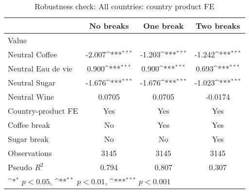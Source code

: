 \begin{table}[htbp]\centering
\def\sym#1{\ifmmode^{#1}\else\(^{#1}\)\fi}
\caption{Robustness check: All countries: country product FE\label{tab1}}
\begin{tabular}{l*{3}{c}}
\hline\hline
                    &\multicolumn{1}{c}{No breaks}&\multicolumn{1}{c}{One break}&\multicolumn{1}{c}{Two breaks}\\
\hline
Value               &                     &                     &                     \\
Neutral Coffee      &      -2.007\sym{***}&      -1.203\sym{***}&      -1.242\sym{***}\\
Neutral Eau de vie  &       0.900\sym{***}&       0.900\sym{***}&       0.693\sym{***}\\
Neutral Sugar       &      -1.676\sym{***}&      -1.676\sym{***}&      -1.023\sym{***}\\
Neutral Wine        &      0.0705         &      0.0705         &     -0.0174         \\
Country-product FE  &         Yes         &         Yes         &         Yes         \\
Coffee break        &          No         &         Yes         &         Yes         \\
Sugar break         &          No         &          No         &         Yes         \\
\hline
Observations        &        3145         &        3145         &        3145         \\
Pseudo \(R^{2}\)    &       0.794         &       0.807         &       0.307         \\
\hline\hline
\multicolumn{4}{l}{\footnotesize \sym{*} \(p<0.05\), \sym{**} \(p<0.01\), \sym{***} \(p<0.001\)}\\
\end{tabular}
\end{table}
